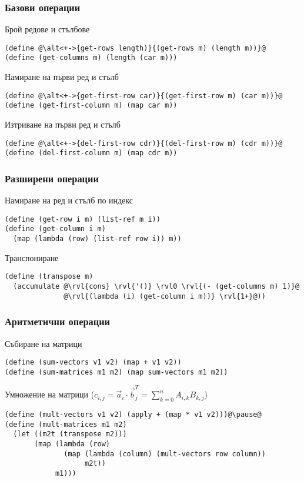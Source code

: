 \documentclass{beamer}
\begin{document}
\begin{frame}[fragile]
  \frametitle{Базови операции}

  Брой редове и стълбове
  \pause
  \onslide<+->
\begin{lstlisting}
(define @\alt<+->{get-rows length)}{(get-rows m) (length m))}@
(define (get-columns m) (length (car m)))
\end{lstlisting}
  \onslide<+->
  Намиране на първи ред и стълб
  \onslide<+->
\begin{lstlisting}
(define @\alt<+->{get-first-row car)}{(get-first-row m) (car m))}@
(define (get-first-column m) (map car m))
\end{lstlisting}
  \onslide<+->
  Изтриване на първи ред и стълб
  \onslide<+->
\begin{lstlisting}
(define @\alt<+->{del-first-row cdr)}{(del-first-row m) (cdr m))}@
(define (del-first-column m) (map cdr m))
\end{lstlisting}
\end{frame}


\begin{frame}[fragile]
  \frametitle{Разширени операции}

  Намиране на ред и стълб по индекс
  \pause
\begin{lstlisting}
(define (get-row i m) (list-ref m i))
(define (get-column i m)
  (map (lambda (row) (list-ref row i)) m))
\end{lstlisting}
  \pause
  Транспониране
  \pause
  \onslide<+->
  \begin{overprint}
\begin{lstlisting}
(define (transpose m)
  (accumulate @\rvl{cons} \rvl{'()} \rvl0 \rvl{(- (get-columns m) 1)}@
              @\rvl{(lambda (i) (get-column i m))} \rvl{1+}@))
\end{lstlisting}
  \end{overprint}
\end{frame}

\begin{frame}[fragile]
  \frametitle{Аритметични операции}

  Събиране на матрици
  \pause
\begin{lstlisting}
(define (sum-vectors v1 v2) (map + v1 v2))
(define (sum-matrices m1 m2) (map sum-vectors m1 m2))
\end{lstlisting}
  \pause
  \vspace{1em}
  Умножение на матрици \pause
  ($c_{i,j} = \vec a_i\cdot \vec b^T_j = \sum_{k=0}^n A_{i,k}B_{k,j}$)
  \pause
  \small
\begin{lstlisting}
(define (mult-vectors v1 v2) (apply + (map * v1 v2)))@\pause@
(define (mult-matrices m1 m2)
  (let ((m2t (transpose m2)))
       (map (lambda (row)
              (map (lambda (column) (mult-vectors row column))
                   m2t))
            m1)))
\end{lstlisting}
\end{frame}
\end{document}
